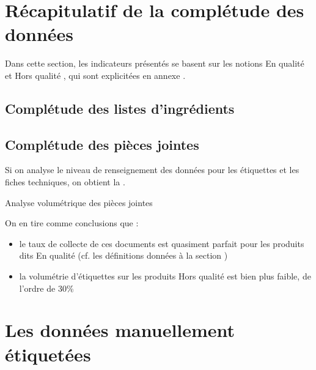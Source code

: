         \section{Récapitulatif de la complétude des données}

            Dans cette section, les indicateurs présentés se basent sur les notions \og En qualité \fg et \og Hors qualité \fg, qui sont explicitées en annexe . 

            \subsection{Complétude des listes d'ingrédients}



            \subsection{Complétude des pièces jointes}

            Si on analyse le niveau de renseignement des données pour les étiquettes et les fiches techniques, on obtient la .

            \begin{table}[htbp]
                \begin{center}
                {\tiny
                
                }
                \caption{Analyse volumétrique des pièces jointes}
                \label{tbl:attached_files_counts}
                \end{center}
            \end{table}

            On en tire comme conclusions que : 
            \begin{itemize}
                \item le taux de collecte de ces documents est quasiment parfait pour les produits dits \og En qualité \fg (cf. les définitions données à la section )
                \item la volumétrie d'étiquettes sur les produits \og Hors qualité \fg est bien plus faible, de l'ordre de 30\%
            \end{itemize}

        \section{Les données \og manuellement étiquetées \fg}
        \label{manually_labelled_data}

